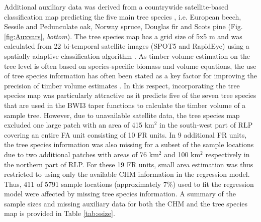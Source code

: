 \documentclass[remotesensing,article,submit,moreauthors,pdftex,10pt,a4paper]{mdpi}
\begin{document}
Additional auxiliary data was derived from a countrywide satellite-based classification map predicting the five main tree species \citep{stoffels2015}, i.e. European beech, Sessile and Pedunculate oak, Norway spruce, Douglas fir and Scots pine (Fig. \ref{fig:Auxvars}, \textit{bottom}). The tree species map has a grid size of 5x5 m and was calculated from 22 bi-temporal satellite images (SPOT5 and RapidEye) using a spatially adaptive classification algorithm \citep{stoffels2012}. As timber volume estimation on the tree level is often based on species-specific biomass and volume equations, the use of tree species information has often been stated as a key factor for improving the precision of timber volume estimates \citep{white2016}. In this respect, incorporating the tree species map was particularly attractive as it predicts five of the seven tree species that are used in the BWI3 taper functions \citep{kublin2013} to calculate the timber volume of a sample tree. However, due to unavailable satellite data, the tree species map excluded one large patch with an area of 415 km$^2$ in the south-west part of RLP covering an entire FA unit consisting of 10 FR units. In 9 additional FR units, the tree species information was also missing for a subset of the sample locations due to two additional patches with areas of 76 km$^2$ and 100 km$^2$ respectively in the northern part of RLP. For these 19 FR units, small area estimation was thus restricted to using only the available CHM information in the regression model. Thus, 411 of 5791 sample locations (approximately 7\%) used to fit the regression model were affected by missing tree species information. A summary of the sample sizes and missing auxiliary data for both the CHM and the tree species map is provided in Table \ref{tab:ssize}.
\end{document}
